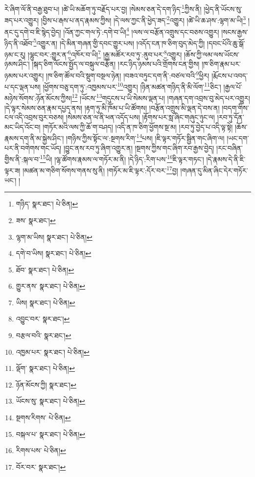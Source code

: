 རེ་ཞིག་ལོ་ནི་བརྒྱ་ཐུབ་པ། །ཚེ་ཡི་མཆོག་ཏུ་བརྗོད་པར་བྱ། །སེམས་ཅན་དེ་དག་ཉིད་\footnote{གཉིད་  སྣར་ཐང་།  པེ་ཅིན། }ཀྱིས་ནི། །ཕྱེད་ནི་ཡོངས་སུ་ཟད་པར་འགྱུར། །བྱིས་པ་རྒས་པ་ནད་རྣམས་ཀྱིས། །དེ་ལས་ཀྱང་ནི་ཕྱེད་ཟད་\footnote{ཟས་  སྣར་ཐང་། }འགྱུར། །ཚེ་ཡི་ཆ་ཤས་:ལྷག་མ་ཡི།\footnote{ལྷག་མ་ཡིས།  སྣར་ཐང་།  པེ་ཅིན། } །ནང་དུ་དགེ་བ་ཇི་སྙེད་བྱེད། །འོན་ཀྱང་གལ་ཏེ་:དགེ་བ་ཡི།\footnote{དགེ་བ་ཡིས།  སྣར་ཐང་།  པེ་ཅིན། } །ལས་ལ་བརྩོན་འགྲུས་དང་བཅས་འགྱུར། །སངས་རྒྱས་ཉིད་ནི་འཐོབ་\footnote{ཐོབ་  སྣར་ཐང་།  པེ་ཅིན། }འགྱུར་ན། །དེ་མིན་གཞན་གྱི་དབང་གྱུར་པས། །འདོད་ངན་ཁ་ཅིག་བུད་མེད་ཀྱི། །དབང་པོའི་ཆུ་སྒོ་ཉམ་ང་རུ། །ལྷུང་བར་:གྱུར་ན་\footnote{གྱུར་ནས་  སྣར་ཐང་།  པེ་ཅིན། }འཁོར་བ་ཡི།\footnote{ཡིས།  སྣར་ཐང་།  པེ་ཅིན། } །རྒྱ་མཚོར་རབ་ཏུ་:ནུབ་པར་\footnote{འབྱུང་བར་  སྣར་ཐང་། }འགྱུར། །ཆོས་ཀྱི་ལམ་ལས་ཡོངས་ཉམས་ཤིང་། །སྐད་ཅིག་ལོངས་སྤྱོད་ལ་བསྐུལ་བརྩོན། །རང་ཉིད་ཉམས་པའི་གྲོགས་ངན་གྱིས། །ཁ་ཅིག་རྣམ་པར་ཉམས་པར་འགྱུར། །ཁ་ཅིག་ཚོལ་བའི་སྡུག་བསྔལ་ཉེན། །བཟའ་བཏུང་དག་ནི་:བཙལ་བའི་\footnote{བརྩལ་བའི་  སྣར་ཐང་། }ཕྱིར། །རྨོངས་པ་འབད་པ་དང་ལྡན་པས། །ཕྱོགས་བཅུ་དག་ཏུ་:འཁྱམས་པར་\footnote{འཁྱམ་པར་  སྣར་ཐང་།  པེ་ཅིན། }འགྱུར། །ཉིན་མཚན་གཉིད་ནི་མི་ལོག་\footnote{ལྡོག་  སྣར་ཐང་།  པེ་ཅིན། }ཅིང་། །རྒྱལ་པོ་མཉེས་སོགས་:ཉོན་མོངས་ཀྱིས།\footnote{ཉོན་མོངས་ཀྱི།  སྣར་ཐང་། } །ཡོངས་\footnote{ཡོངས་སུ་  སྣར་ཐང་།  པེ་ཅིན། }གདུངས་པ་ཡི་སེམས་ལྡན་པ། །གཞན་དག་འབྲས་བུ་མེད་པར་འགྱུར། །དེ་ལྟར་སེམས་ཅན་རྣམ་དཔྱད་ནས། །རྟག་ཏུ་མི་ཁོམ་པ་ཡི་ཚོགས། །བརྩོན་འགྲུས་མི་ལྡན་དེ་བས་ན། །བདག་གིས་ངལ་འདི་འབྲས་བུར་བཅས། །སེམས་ཅན་ལ་ནི་ཕན་འདོད་པས། །རྟོགས་པར་སླ་ཞིང་གཞུང་ཉུང་ལ། །རབ་ཏུ་དོན་མང་ཡིད་འོང་བ། །གཏོར་མའི་ལས་ཀྱི་ཆོ་ག་བཤད། །འདི་ན་ཁ་ཅིག་ཕྱོགས་སྔ་མ། །རབ་ཏུ་བྱེད་པ་འདི་ལྟ་སྟེ། །ཆོས་རྣམས་དག་ནི་མ་སྐྱེས་ཤིང་། །གཉིས་ཀྱིས་སྟོང་ལ་:སྔགས་རིག་\footnote{སྔགས་རིགས་  པེ་ཅིན། }པས། །ཇི་ལྟར་གཏོར་སྦྱིན་གང་ཞིག་ལ། །ཡང་དག་པར་ནི་བགེགས་གང་ཡོད། །བྱུང་ནས་རབ་ཏུ་ཞིག་འགྱུར་ན། །སྔགས་ཀྱིས་གང་ཞིག་རབ་རྒྱས་བྱེད། །རང་བཞིན་གྱིས་ནི་:སྐལ་བ་\footnote{བསྐལ་པ་  སྣར་ཐང་།  པེ་ཅིན། }ཡི། །ལྷ་ཚོགས་རྣམས་ལ་གཏོར་མ་ནི། །དེ་ཉིད་:རིག་པས་\footnote{རིགས་པས་  པེ་ཅིན། }ཇི་ལྟར་གཏང་། །དེ་རྣམས་དེ་ནི་ཇི་ལྟར་ཟ། །མཚན་མ་གཅིག་སོགས་གནས་སུ་ནི། །གཏོར་མ་ཇི་ལྟར་:དོར་བར་\footnote{བོར་བར་  སྣར་ཐང་། }བྱ། །གཞན་དུ་མིན་ཞིང་དེར་གཏོར་ཡང་། །
